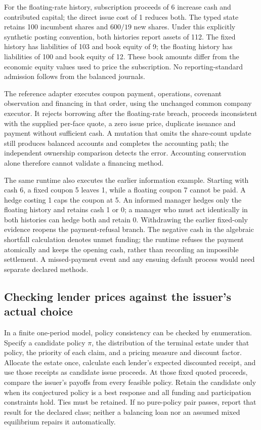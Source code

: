 \documentclass[11pt,a4paper]{article}
\begin{document}
For the floating-rate history, subscription proceeds of 6 increase cash and
contributed capital; the direct issue cost of 1 reduces both. The typed state
retains 100 incumbent shares and $600/19$ new shares. Under this explicitly
synthetic posting convention, both histories report assets of 112. The fixed
history has liabilities of 103 and book equity of 9; the floating history has
liabilities of 100 and book equity of 12. These book amounts differ from the
economic equity values used to price the subscription. No reporting-standard
admission follows from the balanced journals.

The reference adapter executes coupon payment, operations, covenant observation
and financing in that order, using the unchanged common company executor.
It rejects borrowing after the floating-rate breach, proceeds inconsistent
with the supplied per-face quote, a zero issue price, duplicate issuance and
payment without sufficient cash. A mutation that omits the share-count update
still produces balanced accounts and completes the accounting path; the
independent ownership comparison detects the error. Accounting conservation
alone therefore cannot validate a financing method.

The same runtime also executes the earlier information example. Starting with
cash 6, a fixed coupon 5 leaves 1, while a floating coupon 7 cannot be paid.
A hedge costing 1 caps the coupon at 5. An informed manager hedges only the
floating history and retains cash 1 or 0; a manager who must act identically in
both histories can hedge both and retain 0. Withdrawing the earlier fixed-only
evidence reopens the payment-refusal branch. The negative cash in the algebraic
shortfall calculation denotes unmet funding; the runtime refuses the payment
atomically and keeps the opening cash, rather than recording an impossible
settlement. A missed-payment event and any ensuing default process would need
separate declared methods.

\subsection{Checking lender prices against the issuer's actual choice}
In a finite one-period model, policy consistency can be checked by enumeration.
Specify a candidate policy $\pi$, the distribution of the terminal estate under
that policy, the priority of each claim, and a pricing measure and discount
factor. Allocate the estate once, calculate each lender's expected discounted
receipt, and use those receipts as candidate issue proceeds. At those fixed
quoted proceeds, compare the issuer's payoffs from every feasible policy.
Retain the candidate only when its conjectured policy is a best response and
all funding and participation constraints hold. Ties must be retained. If no
pure-policy pair passes, report that result for the declared class; neither a
balancing loan nor an assumed mixed equilibrium repairs it automatically.
\end{document}

